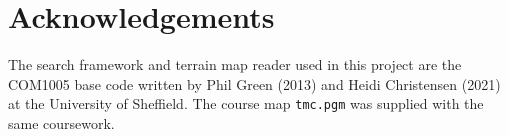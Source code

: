 \chapter*{\Large \center Acknowledgements}

The search framework and terrain map reader used in this project are the COM1005 base code written by Phil Green (2013) and Heidi Christensen (2021) at the University of Sheffield. The course map \texttt{tmc.pgm} was supplied with the same coursework.
